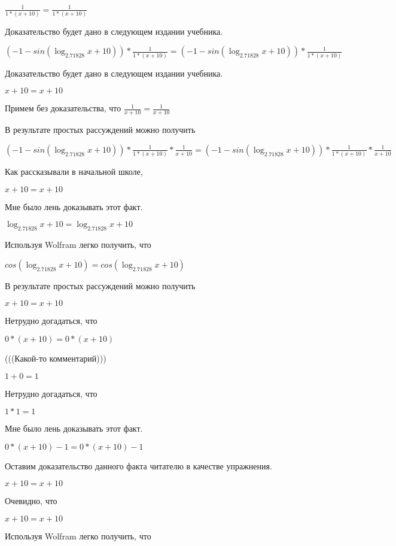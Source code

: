 \documentclass[12pt,a4paper,fleqn]{article}
\theoremstyle{definition}
\begin{document}
$\frac{ 1 }{ 1  * ( x  +  10 )}
 = \frac{ 1 }{ 1  * ( x  +  10 )}
$

Доказательство будет дано в следующем издании учебника.

$( -1  - sin(\log_{ 2.71828 }{ x  +  10 })) * \frac{ 1 }{ 1  * ( x  +  10 )}
 = ( -1  - sin(\log_{ 2.71828 }{ x  +  10 })) * \frac{ 1 }{ 1  * ( x  +  10 )}
$

Доказательство будет дано в следующем издании учебника.

$ x  +  10  =  x  +  10 $

Примем без доказательства, что
$\frac{ 1 }{ x  +  10 }
 = \frac{ 1 }{ x  +  10 }
$

В результате простых рассуждений можно получить

$( -1  - sin(\log_{ 2.71828 }{ x  +  10 })) * \frac{ 1 }{ 1  * ( x  +  10 )}
 * \frac{ 1 }{ x  +  10 }
 = ( -1  - sin(\log_{ 2.71828 }{ x  +  10 })) * \frac{ 1 }{ 1  * ( x  +  10 )}
 * \frac{ 1 }{ x  +  10 }
$

Как рассказывали в начальной школе,

$ x  +  10  =  x  +  10 $

Мне было лень доказывать этот факт.

$\log_{ 2.71828 }{ x  +  10 } = \log_{ 2.71828 }{ x  +  10 }$

Используя Wolfram легко получить, что

$cos(\log_{ 2.71828 }{ x  +  10 }) = cos(\log_{ 2.71828 }{ x  +  10 })$

В результате простых рассуждений можно получить

$ x  +  10  =  x  +  10 $

Нетрудно догадаться, что

$ 0  * ( x  +  10 ) =  0  * ( x  +  10 )$

(((Какой-то комментарий)))

$ 1  +  0  =  1 $

Нетрудно догадаться, что

$ 1  *  1  =  1 $

Мне было лень доказывать этот факт.

$ 0  * ( x  +  10 ) -  1  =  0  * ( x  +  10 ) -  1 $

Оставим доказательство данного факта читателю в качестве упражнения.

$ x  +  10  =  x  +  10 $

Очевидно, что

$ x  +  10  =  x  +  10 $

Используя Wolfram легко получить, что
\end{document}
